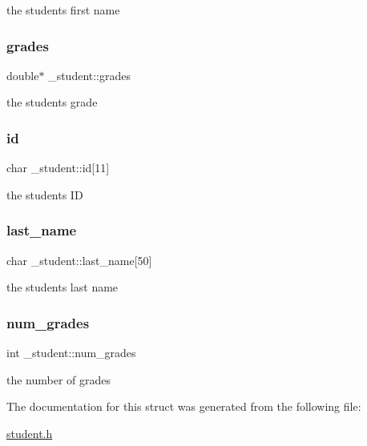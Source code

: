 the student\textquotesingle{}s first name \mbox{\label{struct__student_ad0f75a9ff0f6104eb9e3bb3c4f7ad97b}} 
\subsubsection{\texorpdfstring{grades}{grades}}
{\footnotesize\ttfamily double$\ast$ \+\_\+student\+::grades}

the student\textquotesingle{}s grade \mbox{\label{struct__student_adaee78078859cdecdbe9128dd655b748}} 
\subsubsection{\texorpdfstring{id}{id}}
{\footnotesize\ttfamily char \+\_\+student\+::id\mbox{[}11\mbox{]}}

the student\textquotesingle{}s ID \mbox{\label{struct__student_a18eb2a90671a2292c017b8f4fbde7eec}} 
\subsubsection{\texorpdfstring{last\+\_\+name}{last\_name}}
{\footnotesize\ttfamily char \+\_\+student\+::last\+\_\+name\mbox{[}50\mbox{]}}

the student\textquotesingle{}s last name \mbox{\label{struct__student_a6592ee968ed2226737f45243e7602636}} 
\subsubsection{\texorpdfstring{num\+\_\+grades}{num\_grades}}
{\footnotesize\ttfamily int \+\_\+student\+::num\+\_\+grades}

the number of grades 

The documentation for this struct was generated from the following file\+:\begin{DoxyCompactItemize}
\item 
\mbox{\hyperlink{student_8h}{student.\+h}}\end{DoxyCompactItemize}
